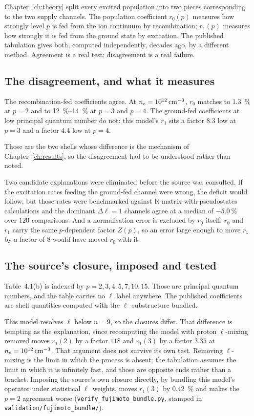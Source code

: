 Chapter~\ref{ch:theory} split every excited population into two pieces
corresponding to the two supply channels. The population coefficient $r_0(p)$
measures how strongly level $p$ is fed from the ion continuum by recombination;
$r_1(p)$ measures how strongly it is fed from the ground state by excitation.
The published tabulation gives both, computed independently, decades ago, by a
different method. Agreement is a real test; disagreement is a real failure.

\subsection{The disagreement, and what it measures}

The recombination-fed coefficients agree. At
$n_e = 10^{12}\,\si{\per\cubic\centi\metre}$, $r_0$ matches to
\SI{1.3}{\percent} at $p=2$ and to \SIrange{12}{14}{\percent} at $p=3$ and
$p=4$. The ground-fed coefficients at low principal quantum number do not: this
model's $r_1$ sits a factor $8.3$ low at $p=3$ and a factor $4.4$ low at $p=4$.

Those are the two shells whose difference is the mechanism of
Chapter~\ref{ch:results}, so the disagreement had to be understood rather than
noted.

Two candidate explanations were eliminated before the source was consulted. If
the excitation rates feeding the ground-fed channel were wrong, the deficit
would follow, but those rates were benchmarked against
R-matrix-with-pseudostates calculations and the dominant $\Delta\ell = 1$
channels agree at a median of $-\SI{5.0}{\percent}$ over $120$ comparisons. And
a normalisation error is excluded by $r_0$ itself: $r_0$ and $r_1$ carry the
same $p$-dependent factor $Z(p)$, so an error large enough to move $r_1$ by a
factor of $8$ would have moved $r_0$ with it.

\subsection{The source's closure, imposed and tested}

Table~4.1(b) is indexed by $p = 2, 3, 4, 5, 7, 10, 15$. Those are principal
quantum numbers, and the table carries no $\ell$ label anywhere. The published
coefficients are shell quantities computed with the $\ell$~substructure
bundled.

This model resolves $\ell$ below $n=9$, so the closures differ. That
difference is tempting as the explanation, since recomputing the model with
proton $\ell$-mixing removed moves $r_1(2)$ by a factor $118$ and $r_1(3)$ by a
factor $3.35$ at $n_e = 10^{12}\,\si{\per\cubic\centi\metre}$. That argument
does not survive its own test. Removing $\ell$-mixing is the limit in which the process is
absent; the tabulation assumes the limit in which it is infinitely fast, and
those are opposite ends rather than a bracket. Imposing the source's own closure
directly, by bundling this model's operator under statistical $\ell$~weights,
moves $r_1(3)$ by \SI{0.42}{\percent} and makes the $p=2$ agreement worse
(\texttt{verify\_fujimoto\_bundle.py}, stamped in
\texttt{validation/fujimoto\_bundle/}).

